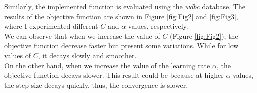 \documentclass[11 pt]{article}
\begin{document}
\begin{enumerate}[label=(\Alph*)]
\begin{lstlisting}[language=R]
	\end{lstlisting}
	
	\vspace{5mm}
	Similarly, the implemented function is evaluated using the $wdbc$ database. The results of the objective function are shown in Figure \ref{fig:Fig2} and \ref{fig:Fig3}, where I experimented different $C$ and $\alpha$ values, respectively. \\
	We can observe that when we increase the value of  $C$ (Figure \ref{fig:Fig2}), the objective function decrease faster but present some variations. While for low values of $C$, it decays slowly and smoother.\\
	On the other hand, when we increase the value of the learning rate $\alpha$, the objective function decays slower. This result could be because at higher $\alpha$ values, the step size decays quickly, thus, the convergence is slower. 
	

\end{enumerate}
\end{document}
